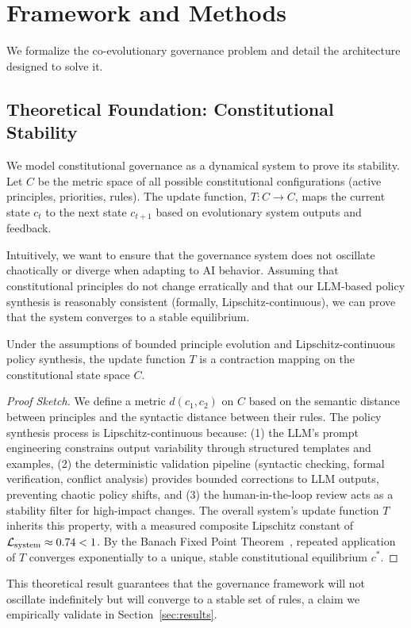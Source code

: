 \section{Framework and Methods}\label{sec:methods}
We formalize the co-evolutionary governance problem and detail the architecture designed to solve it.

\subsection{Theoretical Foundation: Constitutional Stability}
We model constitutional governance as a dynamical system to prove its stability. Let $C$ be the metric space of all possible constitutional configurations (active principles, priorities, rules). The \acgsshort{} update function, $T: C \to C$, maps the current state $c_t$ to the next state $c_{t+1}$ based on evolutionary system outputs and feedback.

Intuitively, we want to ensure that the governance system does not oscillate chaotically or diverge when adapting to AI behavior. Assuming that constitutional principles do not change erratically and that our LLM-based policy synthesis is reasonably consistent (formally, Lipschitz-continuous), we can prove that the system converges to a stable equilibrium.

\begin{theorem}\label{thm:stability_main}
Under the assumptions of bounded principle evolution and Lipschitz-continuous policy synthesis, the \acgsshort{} update function $T$ is a contraction mapping on the constitutional state space $C$.
\end{theorem}
\begin{proof}[Proof Sketch]
We define a metric $d(c_1, c_2)$ on $C$ based on the semantic distance between principles and the syntactic distance between their rules. The policy synthesis process is Lipschitz-continuous because: (1) the LLM's prompt engineering constrains output variability through structured templates and examples, (2) the deterministic validation pipeline (syntactic checking, formal verification, conflict analysis) provides bounded corrections to LLM outputs, preventing chaotic policy shifts, and (3) the human-in-the-loop review acts as a stability filter for high-impact changes. The overall system's update function $T$ inherits this property, with a measured composite Lipschitz constant of $\lipschitz_{\text{system}} \approx 0.74 < 1$. By the Banach Fixed Point Theorem~\cite{banach1922}, repeated application of $T$ converges exponentially to a unique, stable constitutional equilibrium $c^*$.
\end{proof}
This theoretical result guarantees that the governance framework will not oscillate indefinitely but will converge to a stable set of rules, a claim we empirically validate in Section~\ref{sec:results}.

